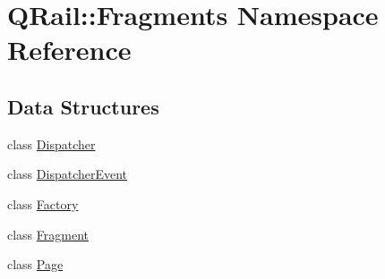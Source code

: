 \hypertarget{namespaceQRail_1_1Fragments}{}\section{Q\+Rail\+::Fragments Namespace Reference}
\label{namespaceQRail_1_1Fragments}
\subsection*{Data Structures}
\begin{DoxyCompactItemize}
\item 
class \mbox{\hyperlink{classQRail_1_1Fragments_1_1Dispatcher}{Dispatcher}}
\item 
class \mbox{\hyperlink{classQRail_1_1Fragments_1_1DispatcherEvent}{Dispatcher\+Event}}
\item 
class \mbox{\hyperlink{classQRail_1_1Fragments_1_1Factory}{Factory}}
\item 
class \mbox{\hyperlink{classQRail_1_1Fragments_1_1Fragment}{Fragment}}
\item 
class \mbox{\hyperlink{classQRail_1_1Fragments_1_1Page}{Page}}
\end{DoxyCompactItemize}
